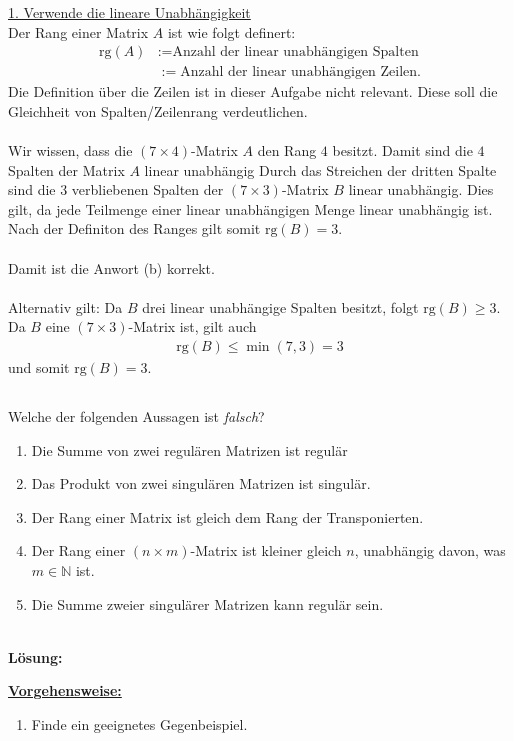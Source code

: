 \underline{1. Verwende die lineare Unabhängigkeit}\\
Der Rang einer Matrix $ A $ ist wie folgt definert:
\begin{align*}
	\mathrm{rg}(A) &:= \textrm{Anzahl der linear unabhängigen Spalten}\\
	&:=\textrm{Anzahl der linear unabhängigen Zeilen}.
\end{align*}
Die Definition über die Zeilen ist in dieser Aufgabe nicht relevant. Diese soll die Gleichheit von Spalten/Zeilenrang verdeutlichen.\\
\\
Wir wissen, dass die $ (7 \times 4) $-Matrix $ A $ den Rang $ 4 $ besitzt. 
Damit sind die $ 4 $ Spalten der Matrix $ A $ linear unabhängig 
Durch das Streichen der dritten Spalte sind die $ 3 $ verbliebenen Spalten der $ (7 \times 3) $-Matrix $ B $ linear unabhängig.
Dies gilt, da jede Teilmenge einer linear unabhängigen Menge linear unabhängig ist. Nach der Definiton des Ranges gilt somit $ \mathrm{rg}(B) = 3 $.\\
\\
Damit ist die Anwort (b) korrekt.\\
\\
Alternativ gilt: Da $ B $ drei linear unabhängige Spalten besitzt, folgt $ \mathrm{rg}(B) \geq 3 $. Da $ B $ eine $ (7 \times 3) $-Matrix ist, gilt auch
\begin{align*}
	\mathrm{rg}(B) \leq \min(7,3) = 3
\end{align*}
und somit $ \mathrm{rg}(B) = 3 $.


\newpage
\subsection*{}
Welche der folgenden Aussagen ist \textit{falsch}?
\renewcommand{\labelenumi}{(\alph{enumi})}
\begin{enumerate}
	\item 
	Die Summe von zwei regulären Matrizen ist regulär
	\item
	Das Produkt von zwei singulären Matrizen ist singulär.
	
	\item
	Der Rang einer Matrix ist gleich dem Rang der Transponierten.
	\item
	Der Rang einer $ (n \times m) $-Matrix ist kleiner gleich $ n $, unabhängig davon, was $ m \in \mathbb{N} $ ist.
	\item 
	Die Summe zweier singulärer Matrizen kann regulär sein.
\end{enumerate}
\ \\
\textbf{Lösung:}
\begin{mdframed}
	\underline{\textbf{Vorgehensweise:}}
	\renewcommand{\labelenumi}{\theenumi.}
	\begin{enumerate}
		\item Finde ein geeignetes Gegenbeispiel. 
	\end{enumerate}
\end{mdframed}

